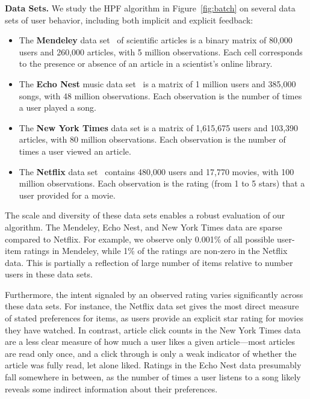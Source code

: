 {\bf Data Sets.} We study the HPF algorithm in Figure~\ref{fig:batch}
on several data sets of user behavior, including both implicit and
explicit feedback:
\begin{itemize}
\item The {\bf Mendeley} data set~\cite{Jack:2010} of scientific
  articles is a binary matrix of 80,000 users and 260,000 articles,
  with 5 million observations.  Each cell corresponds to the presence
  or absence of an article in a scientist's online library.
\item The {\bf Echo Nest} music data set~\cite{Bertin-Mahieux:2011} is
  a matrix of 1 million users and 385,000 songs, with 48 million
  observations.  Each observation is the number of times a user played
  a song.
\item The {\bf New York Times} data set is a matrix of 1,615,675 users
  and 103,390 articles, with 80 million observations.  Each
  observation is the number of times a user viewed an article.

\item The {\bf Netflix} data set~\cite{Koren:2009} contains 480,000
  users and 17,770 movies, with 100 million observations. Each
  observation is the rating (from 1 to 5 stars) that a user provided
  for a movie.
\end{itemize}

The scale and diversity of these data sets enables a robust evaluation
of our algorithm. The Mendeley, Echo Nest, and New York Times data
are sparse compared to Netflix. For example, we observe
only 0.001\% of all possible user-item ratings in Mendeley, while 1\%
of the ratings are non-zero in the Netflix data. This is partially a
reflection of large number of items relative to number users in these
data sets.

Furthermore, the intent signaled by an observed rating varies
significantly across these data sets. For instance, the Netflix data
set gives the most direct measure of stated preferences for items, as
users provide an explicit star rating for movies they have watched. In
contrast, article click counts in the New York Times data are a less
clear measure of how much a user likes a given article---most articles
are read only once, and a click through is only a weak indicator of
whether the article was fully read, let alone liked. Ratings in the
Echo Nest data presumably fall somewhere in between, as the number of
times a user listens to a song likely reveals some indirect
information about their preferences.

